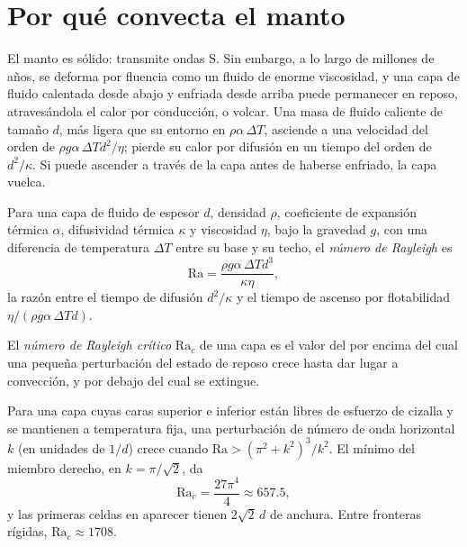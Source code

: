 \section{Por qué convecta el manto}

El manto es sólido: transmite ondas S. Sin embargo, a lo largo de millones de años, se
deforma por fluencia como un fluido de enorme viscosidad, y una capa de fluido calentada desde
abajo y enfriada desde arriba puede permanecer en reposo, atravesándola el calor por
conducción, o volcar. Una masa de fluido caliente de tamaño $d$, más ligera que su
entorno en $\rho\alpha\,\Delta T$, asciende a una velocidad del orden de
$\rho g\alpha\,\Delta T d^2/\eta$; pierde su calor por difusión en un tiempo del
orden de $d^2/\kappa$. Si puede ascender a través de la capa antes de haberse enfriado, la
capa vuelca.

\begin{definition}\label{def:b3:mantle-convection:rayleigh}
Para una capa de fluido de espesor $d$, densidad $\rho$, coeficiente de expansión térmica
$\alpha$, difusividad térmica $\kappa$ y viscosidad $\eta$, bajo
la gravedad $g$, con una diferencia de temperatura $\Delta T$ entre su base y su
techo, el \emph{número de Rayleigh} es
\[
  \mathrm{Ra} = \frac{\rho g\alpha\,\Delta T d^3}{\kappa\eta},
\]
la razón entre el tiempo de difusión $d^2/\kappa$ y el tiempo de ascenso
por flotabilidad $\eta/(\rho g\alpha\,\Delta Td)$.
\end{definition}

\begin{definition}\label{def:b3:mantle-convection:critical}
El \emph{número de Rayleigh crítico}
$\mathrm{Ra}_c$ de una capa es el valor del  por encima del cual una
pequeña perturbación del estado de reposo crece hasta dar lugar a convección, y por debajo del cual
se extingue.
\end{definition}

\begin{proposition}\label{prop:b3:mantle-convection:onset}
Para una capa cuyas caras superior e inferior están libres de esfuerzo de cizalla y se mantienen
a temperatura fija, una perturbación de número de onda horizontal $k$ (en unidades de $1/d$)
crece cuando $\mathrm{Ra} > (\pi^2 + k^2)^3/k^2$. El mínimo del
miembro derecho, en $k = \pi/\sqrt2$, da
\[
  \mathrm{Ra}_c = \frac{27\pi^4}{4} \approx 657.5,
\]
y las primeras celdas en aparecer tienen $2\sqrt2\,d$ de anchura. Entre fronteras rígidas,
$\mathrm{Ra}_c \approx 1708$.
\end{proposition}

